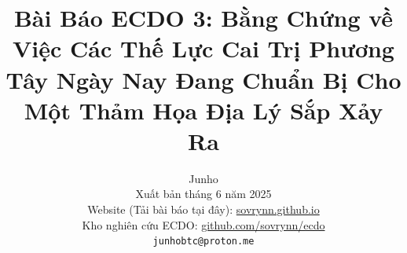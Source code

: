 \documentclass[10pt,twocolumn,letterpaper]{article}
\begin{document}
\title{Bài Báo ECDO 3: Bằng Chứng về Việc Các Thế Lực Cai Trị Phương Tây Ngày Nay Đang Chuẩn Bị Cho Một Thảm Họa Địa Lý Sắp Xảy Ra}

\author{Junho\\
Xuất bản tháng 6 năm 2025\\
Website (Tải bài báo tại đây): \href{https://sovrynn.github.io}{sovrynn.github.io}\\
Kho nghiên cứu ECDO: \href{https://github.com/sovrynn/ecdo}{github.com/sovrynn/ecdo}\\
{\tt\small junhobtc@proton.me}
}

\maketitle
\end{document}
